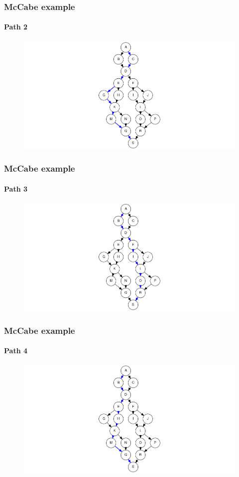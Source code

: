 \begin{frame}[c]
\frametitle{McCabe example}
\framesubtitle{Path 2}

\begin{figure}
	\centering
	\includegraphics[scale=.3]{aux/examples/mccabe/mccabe-example-path-2}
\end{figure}
\end{frame}


\begin{frame}[c]
\frametitle{McCabe example}
\framesubtitle{Path 3}

\begin{figure}
	\centering
	\includegraphics[scale=.3]{aux/examples/mccabe/mccabe-example-path-3}
\end{figure}
\end{frame}


\begin{frame}[c]
\frametitle{McCabe example}
\framesubtitle{Path 4}

\begin{figure}
	\centering
	\includegraphics[scale=.3]{aux/examples/mccabe/mccabe-example-path-4}
\end{figure}
\end{frame}


